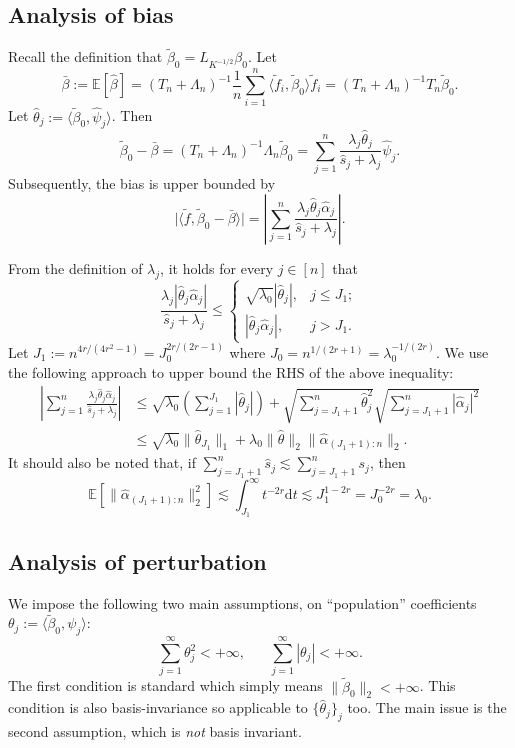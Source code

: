 \documentclass[11pt,a4paper]{article}
\renewcommand{\hat}{\widehat}
\renewcommand{\tilde}{\widetilde}
\theoremstyle{definition}
\theoremstyle{plain}
\theoremstyle{remark}
\newcommand{\ud}{\mathrm d}
\begin{document}
\subsection{Analysis of bias}

Recall the definition that $\tilde\beta_0=L_{K^{-1/2}}\beta_0$. Let 
$$
\bar\beta := \mathbb E[\hat\beta] = (T_n+\Lambda_n)^{-1}\frac{1}{n}\sum_{i=1}^n \langle\tilde f_i,\tilde\beta_0\rangle \tilde f_i = (T_n+\Lambda_n)^{-1}T_n\tilde\beta_0.
$$
Let $\hat\theta_j := \langle\tilde\beta_0, \hat\psi_j\rangle$. Then
$$
\tilde\beta_0-\bar\beta = (T_n+\Lambda_n)^{-1}\Lambda_n \tilde\beta_0 = \sum_{j=1}^n \frac{\lambda_j\hat\theta_j}{\hat s_j+\lambda_j}\hat\psi_j.
$$
Subsequently, the bias is upper bounded by
$$
\big|\langle \tilde f,\tilde\beta_0-\bar\beta\rangle\big| = \left|\sum_{j=1}^n\frac{\lambda_j\hat\theta_j\hat\alpha_j}{\hat s_j+\lambda_j}\right|.
$$

From the definition of $\lambda_j$, it holds for every $j\in[n]$ that
$$
\frac{\lambda_j|\hat\theta_j\hat\alpha_j|}{\hat s_j+\lambda_j} \leq \left\{\begin{array}{ll} \sqrt{\lambda_0}|\hat\theta_j|,& j\leq J_1;\\ |\hat\theta_j\hat\alpha_j|,& j>J_1.\end{array}\right.
$$
Let $J_1 := n^{4r/(4r^2-1)} = J_0^{2r/(2r-1)}$ where $J_0=n^{1/(2r+1)}=\lambda_0^{-1/(2r)}$. We use the following approach to upper bound the RHS of the above inequality:
\begin{align*}
\left|\sum_{j=1}^n\frac{\lambda_j\hat\theta_j\hat\alpha_j}{\hat s_j+\lambda_j}\right|
&\leq \sqrt{\lambda_0}\left(\sum_{j=1}^{J_1}|\hat\theta_j|\right) + \sqrt{\sum_{j=J_1+1}^n \hat\theta_j^2}\sqrt{\sum_{j=J_1+1}^n|\hat\alpha_j|^2}\\
&\leq \sqrt{\lambda_0}\|\hat\theta_{J_1}\|_1 + \lambda_0\|\hat\theta\|_2\|\hat\alpha_{(J_1+1):n}\|_2.
\end{align*}
It should also be noted that, if $\sum_{j=J_1+1}^n \hat s_j\lesssim \sum_{j=J_1+1}^n s_j$, then
$$
\mathbb E[\|\hat\alpha_{(J_1+1):n}\|_2^2] \lesssim \int_{J_1}^{\infty} t^{-2r}\ud t \lesssim J_1^{1-2r} = J_0^{-2r} = \lambda_0.
$$

\subsection{Analysis of perturbation}

We impose the following two main assumptions, on ``population'' coefficients $\theta_j := \langle \tilde\beta_0,\psi_j\rangle$:
$$
\sum_{j=1}^{\infty}\theta_j^2 < +\infty,\;\;\;\;\;\;\sum_{j=1}^{\infty}|\theta_j| < +\infty.
$$
The first condition is standard which simply means $\|\tilde\beta_0\|_2<+\infty$. This condition is also basis-invariance so applicable to $\{\hat\theta_j\}_j$ too. The main issue is the second assumption, which is \emph{not} basis invariant.
\end{document}
